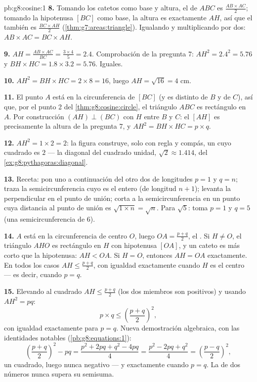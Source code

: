 \begin{solution}{pb:g8:cosine:1}
\textbf{8.} Tomando los catetos como base y altura, el  de $ABC$
es $\frac{AB \times AC}{2}$; tomando la hipotenusa $[BC]$ como base,
la altura es exactamente $AH$, así que el  también es
$\frac{BC \times AH}{2}$ (\cref{thm:g7:areas:triangle}). Igualando
y multiplicando por dos: $AB \times AC = BC \times AH$.

\textbf{9.} $AH = \frac{AB \times AC}{BC} = \frac{3 \times 4}{5}
= 2.4$. Comprobación de la pregunta 7:
$AH^2 = 2.4^2 = 5.76$ y
$BH \times HC = 1.8 \times 3.2 = 5.76$. Iguales.

\textbf{10.} $AH^2 = BH \times HC = 2 \times 8 = 16$, luego
$AH = \sqrt{16} = 4$ cm.

\textbf{11.} El punto $A$ está en la circunferencia de  $[BC]$
(y es distinto de $B$ y de $C$), así que, por el punto 2 del
\cref{thm:g8:cosine:circle}, el triángulo $ABC$ es rectángulo en
$A$. Por construcción $(AH) \perp (BC)$ con $H$ entre $B$ y
$C$: el  $[AH]$ es precisamente la altura de la pregunta 7,
y $AH^2 = BH \times HC = p \times q$.

\textbf{12.} $AH^2 = 1 \times 2 = 2$: la figura construye, solo con
regla y compás, un  cuyo cuadrado es $2$ --- la
diagonal del cuadrado unidad, $\sqrt2 \approx 1.414$, del
\cref{ex:g8:pythagoras:diagonal}.

\textbf{13.} Receta: pon uno a continuación del otro dos  de longitudes
$p = 1$ y $q = n$; traza la semicircunferencia cuyo  es el
 entero (de longitud $n + 1$); levanta la perpendicular en el
punto de unión; corta a la semicircunferencia en un punto cuya
distancia al punto de unión es $\sqrt{1 \times n} = \sqrt n$. Para
$\sqrt5$: toma $p = 1$ y $q = 5$ (una semicircunferencia de 
$6$).

\textbf{14.} $A$ está en la circunferencia de centro $O$, luego
$OA = \frac{p+q}{2}$, el . Si $H \neq O$, el triángulo
$AHO$ es rectángulo en $H$ con hipotenusa $[OA]$, y un cateto es
más corto que la hipotenusa: $AH < OA$. Si $H = O$, entonces
$AH = OA$ exactamente. En todos los casos $AH \leq \frac{p+q}{2}$, con
igualdad exactamente cuando $H$ es el centro --- es decir, cuando
$p = q$.

\textbf{15.} Elevando al cuadrado $AH \leq \frac{p+q}{2}$ (los dos miembros
son positivos) y usando $AH^2 = pq$:
\[
p \times q \leq \left(\frac{p+q}{2}\right)^2 ,
\]
con igualdad exactamente para $p = q$. Nueva demostración algebraica, con las
identidades notables (\cref{pb:g8:equations:1}):
\[
\left(\frac{p+q}{2}\right)^2 - pq
= \frac{p^2 + 2pq + q^2 - 4pq}{4}
= \frac{p^2 - 2pq + q^2}{4}
= \left(\frac{p-q}{2}\right)^2 ,
\]
un cuadrado, luego nunca negativo --- y  exactamente cuando
$p = q$. La  de dos números nunca supera su
semisuma.
\end{solution}
